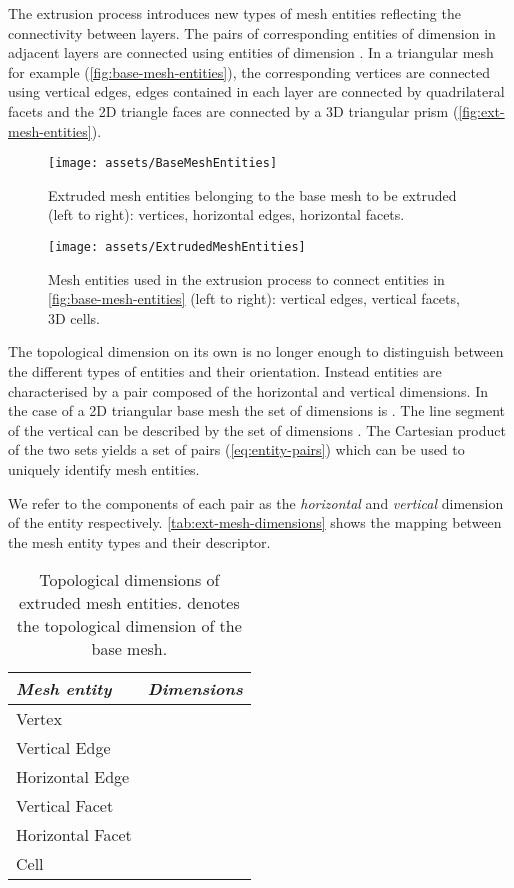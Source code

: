 \documentclass[11pt, a4paper]{scrartcl}
\begin{document}
The extrusion process introduces new types of mesh entities reflecting
the connectivity between layers. The pairs of corresponding entities
of dimension  in adjacent layers are connected using entities of
dimension . In a triangular mesh for example
(\autoref{fig:base-mesh-entities}), the corresponding vertices are connected
using vertical edges, edges contained in each layer are connected by
quadrilateral facets and the 2D triangle faces are connected by a 3D
triangular prism (\autoref{fig:ext-mesh-entities}).
\begin{figure}[htbp]
\centering
\texttt{[image: assets/BaseMeshEntities]}
\caption{Extruded mesh entities belonging to the base mesh to be
  extruded (left to right): vertices, horizontal edges, horizontal
  facets.}
\label{fig:base-mesh-entities}
\end{figure}
\begin{figure}[htbp]
\centering
\texttt{[image: assets/ExtrudedMeshEntities]}
\caption{Mesh entities used in the extrusion process to connect
  entities in \autoref{fig:base-mesh-entities} (left to right):
  vertical edges, vertical facets, 3D cells.}
\label{fig:ext-mesh-entities}
\end{figure}

The topological dimension on its own is no longer enough to
distinguish between the different types of entities and their
orientation. Instead entities are characterised by a pair composed of
the horizontal and vertical dimensions. In the case of a 2D triangular
base mesh the set of dimensions is . The line segment of
the vertical can be described by the set of dimensions . The
Cartesian product of the two sets yields a set of pairs
(\autoref{eq:entity-pairs}) which can be used to uniquely identify
mesh entities.

We refer to the components of each pair as the \textit{horizontal} and
\textit{vertical} dimension of the entity respectively.
\autoref{tab:ext-mesh-dimensions} shows the mapping between the mesh
entity types and their descriptor.
\begin{table}[htbp]
  \centering
  \begin{tabular}{l|l}
    \emph{Mesh entity} & \emph{Dimensions} \\
    \hline
    Vertex             &           \\
    Vertical Edge      &           \\
    Horizontal Edge    &           \\
    Vertical Facet     &     \\
    Horizontal Facet   &       \\
    Cell               &       \\
  \end{tabular}
  \caption{Topological dimensions of extruded mesh entities. 
    denotes the topological dimension of the base
    mesh.\label{tab:ext-mesh-dimensions}}
\end{table}
\end{document}
